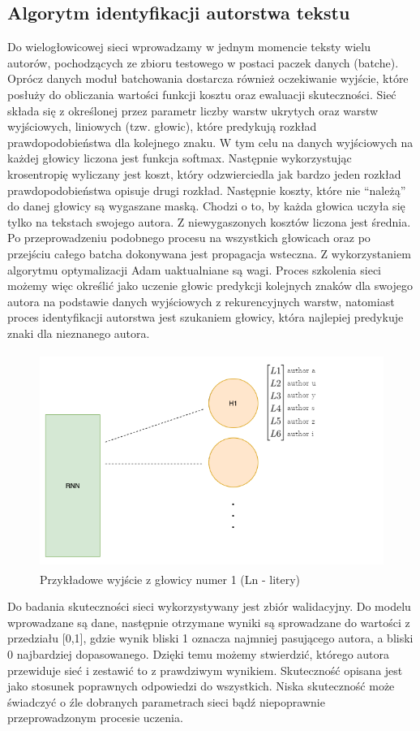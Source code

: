 \subsection{Algorytm identyfikacji autorstwa tekstu}

Do wielogłowicowej sieci wprowadzamy w jednym momencie teksty wielu autorów, pochodzących ze zbioru 
testowego w postaci paczek danych (batche). Oprócz danych moduł batchowania dostarcza również 
oczekiwanie wyjście, które posłuży do obliczania wartości funkcji kosztu oraz ewaluacji skuteczności. 
Sieć składa się z określonej przez parametr liczby warstw ukrytych oraz warstw wyjściowych, 
liniowych (tzw. głowic), które predykują rozkład prawdopodobieństwa dla kolejnego znaku. 
W tym celu na danych wyjściowych na każdej głowicy liczona jest funkcja softmax. 
Następnie wykorzystując
krosentropię wyliczany jest koszt, który odzwierciedla jak bardzo jeden rozkład 
prawdopodobieństwa opisuje drugi rozkład. Następnie koszty, które nie ``należą'' do danej głowicy są wygaszane maską. Chodzi o to, by 
każda głowica uczyła się tylko na tekstach swojego autora. Z niewygaszonych kosztów liczona jest średnia.
Po przeprowadzeniu podobnego procesu na wszystkich głowicach oraz po przejściu całego batcha
 dokonywana jest propagacja wsteczna. 
Z wykorzystaniem algorytmu optymalizacji Adam uaktualniane są wagi. Proces szkolenia sieci
możemy więc określić jako uczenie głowic predykcji kolejnych znaków dla swojego autora na podstawie
danych wyjściowych z rekurencyjnych warstw, natomiast proces identyfikacji autorstwa jest szukaniem głowicy, 
która najlepiej predykuje znaki dla nieznanego autora.

\begin{figure}[H]
\centering
\includegraphics[height=7cm]{./images/rnn-output-2.png}
\caption{Przykładowe wyjście z głowicy numer 1 (Ln - litery)}
\label{fig:test5}
\end{figure} 

Do badania skuteczności sieci wykorzystywany jest zbiór walidacyjny. Do modelu wprowadzane są dane, 
następnie otrzymane wyniki są sprowadzane do wartości z przedziału [0,1], 
gdzie wynik bliski 1 oznacza najmniej pasującego autora, a bliski 0 najbardziej dopasowanego.
Dzięki temu możemy stwierdzić, którego autora przewiduje sieć i zestawić to z prawdziwym wynikiem.
Skuteczność opisana jest jako stosunek poprawnych odpowiedzi do wszystkich. Niska skuteczność może 
świadczyć o źle dobranych parametrach sieci bądź niepoprawnie przeprowadzonym procesie uczenia.
